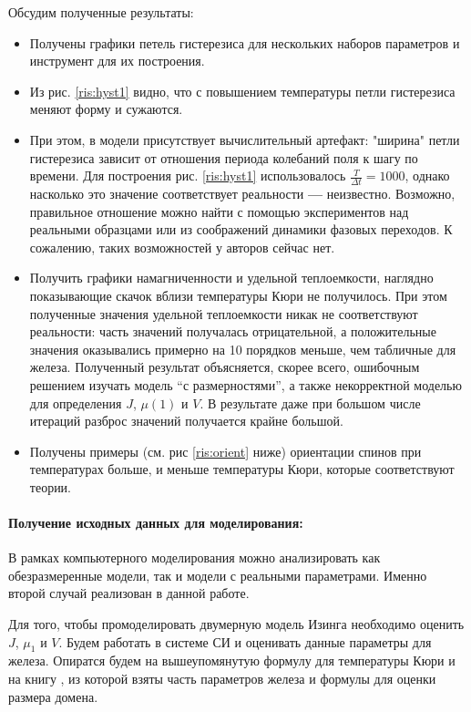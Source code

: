 \documentclass[oneside,final,14pt]{extarticle}
\begin{document}
	Обсудим полученные результаты:
	\begin{itemize}
	\item Получены графики петель гистерезиса для нескольких наборов параметров и инструмент для их построения.
	\item Из рис. \ref{ris:hyst1} видно, что с повышением температуры петли гистерезиса меняют форму и сужаются. 
	\item При этом, в модели присутствует вычислительный артефакт: "ширина" петли гистерезиса зависит от отношения периода колебаний поля к шагу по времени. Для построения рис. \ref{ris:hyst1} использовалось $\frac{T}{\Delta t}=1000$, однако насколько это значение соответствует реальности \textbf{---} неизвестно. Возможно, правильное отношение можно найти с помощью экспериментов над реальными образцами или из соображений динамики фазовых переходов. К сожалению, таких возможностей у авторов сейчас нет. 
	\item Получить графики намагниченности и удельной теплоемкости, наглядно показывающие скачок вблизи температуры Кюри не получилось. При этом полученные значения удельной теплоемкости никак не соответствуют реальности: часть значений получалась отрицательной, а положительные значения оказывались примерно на 10 порядков меньше, чем табличные для железа. Полученный результат объясняется, скорее всего, ошибочным решением изучать модель ``с размерностями'', а также некорректной моделью для определения $J$, $\mu{(1)}$ и $V$. В результате даже при большом числе итераций разброс значений получается крайне большой.
	\item Получены примеры (см. рис \ref{ris:orient} ниже) ориентации спинов при температурах больше, и меньше температуры Кюри, которые соответствуют теории. 
	\end{itemize}

	\paragraph{Получение исходных данных для моделирования:}	
	В рамках компьютерного моделирования можно анализировать как обезразмеренные модели, так и модели с реальными параметрами. Именно второй случай реализован в данной работе.

	Для того, чтобы промоделировать двумерную модель Изинга необходимо оценить $J$, $\mu_{1}$ и $V$. Будем работать в системе СИ и оценивать данные параметры для железа. Опиратся будем на вышеупомянутую формулу для температуры Кюри и на книгу \cite{magn}, из которой взяты часть параметров железа и формулы для оценки размера домена.
\end{document}

